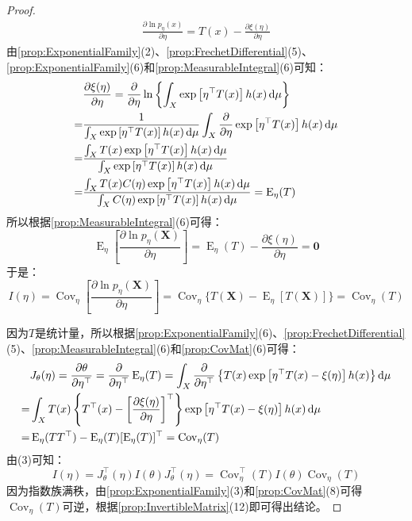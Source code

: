 \begin{proof}
\begin{gather*}
		\frac{\partial\ln p_{\eta}(x)}{\partial\eta}=T(x)-\frac{\partial\xi(\eta)}{\partial\eta}
	\end{gather*}
	由\cref{prop:ExponentialFamily}(2)、\cref{prop:FrechetDifferential}(5)、\cref{prop:ExponentialFamily}(6)和\cref{prop:MeasurableIntegral}(6)可知：
	\begin{align*}
		&\frac{\partial\xi(\eta)}{\partial\eta}=\frac{\partial}{\partial\eta}\ln\left\{\int_{X}\exp\left[\eta^{\top}T(x)\right]h(x)\mathop{}\!\mathrm{d}\mu\right\} \\
		=&\frac{1}{\int_{X}\exp\left[\eta^{\top}T(x)\right]h(x)\mathop{}\!\mathrm{d}\mu}\int_{X}\frac{\partial}{\partial\eta}\exp\left[\eta^{\top}T(x)\right]h(x)\mathop{}\!\mathrm{d}\mu \\
		=&\frac{\int_{X}T(x)\exp\left[\eta^{\top}T(x)\right]h(x)\mathop{}\!\mathrm{d}\mu}{\int_{X}\exp\left[\eta^{\top}T(x)\right]h(x)\mathop{}\!\mathrm{d}\mu} \\
		=&\frac{\int_{X}T(x)C(\eta)\exp\left[\eta^{\top}T(x)\right]h(x)\mathop{}\!\mathrm{d}\mu}{\int_{X}C(\eta)\exp\left[\eta^{\top}T(x)\right]h(x)\mathop{}\!\mathrm{d}\mu}=\operatorname{E}_{\eta}(T)
	\end{align*}
	所以根据\cref{prop:MeasurableIntegral}(6)可得：
	\begin{equation*}
			\operatorname{E}_{\eta}\left[\frac{\partial\ln p_{\eta}(\mathbf{X})}{\partial\eta}\right]=\operatorname{E}_{\eta}(T)-\frac{\partial\xi(\eta)}{\partial\eta}=\mathbf{0}
	\end{equation*}
	于是：
	\begin{equation*}
		I(\eta)=\operatorname{Cov}_{\eta}\left[\frac{\partial\ln p_{\eta}(\mathbf{X})}{\partial\eta}\right]=\operatorname{Cov}_{\eta}\{T(\mathbf{X})-\operatorname{E}_{\eta}[T(\mathbf{X})]\}=\operatorname{Cov}_{\eta}(T)
	\end{equation*}\par
	因为$T$是统计量，所以根据\cref{prop:ExponentialFamily}(6)、\cref{prop:FrechetDifferential}(5)、\cref{prop:MeasurableIntegral}(6)和\cref{prop:CovMat}(6)可得：
	\begin{align*}
		&J_{\theta}(\eta)=\frac{\partial\theta}{\partial\eta^{\top}}=\frac{\partial}{\partial\eta^{\top}}\operatorname{E}_{\eta}(T)=\int_{X}\frac{\partial}{\partial\eta^{\top}}\left\{T(x)\exp\left[\eta^{\top}T(x)-\xi(\eta)\right]h(x)\right\}\mathop{}\!\mathrm{d}\mu \\
		=&\int_{X}T(x)\left\{T^{\top}(x)-\left[\frac{\partial\xi(\eta)}{\partial\eta}\right]^{\top}\right\}\exp\left[\eta^{\top}T(x)-\xi(\eta)\right]h(x)\mathop{}\!\mathrm{d}\mu \\
		=&\operatorname{E}_{\eta}(TT^{\top})-\operatorname{E}_{\eta}(T)[\operatorname{E}_{\eta}(T)]^{\top}=\operatorname{Cov}_{\eta}(T)
	\end{align*}
	由(3)可知：
	\begin{equation*}
		I(\eta)=J_{\theta}^{\top}(\eta)I(\theta)J_{\theta}^{\top}(\eta)=\operatorname{Cov}_{\eta}^{\top}(T)I(\theta)\operatorname{Cov}_{\eta}(T)
	\end{equation*}
	因为指数族满秩，由\cref{prop:ExponentialFamily}(3)和\cref{prop:CovMat}(8)可得$\operatorname{Cov}_{\eta}(T)$可逆，根据\cref{prop:InvertibleMatrix}(12)即可得出结论。
\end{proof}
